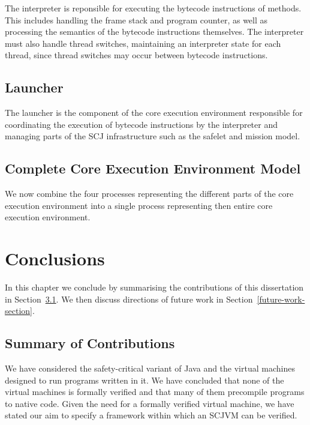 \documentclass[a4paper,10pt]{report}
\begin{document}
The interpreter is reponsible for executing the bytecode instructions
of methods.
This includes handling the frame stack and program counter, as well as
processing the semantics of the bytecode instructions themselves.
The interpreter must also handle thread switches, maintaining an
interpreter state for each thread, since thread switches may occur
between bytecode instructions.



\section{Launcher}
\label{cee-launcher-section}

The launcher is the component of the core execution environment
responsible for coordinating the execution of bytecode instructions by
the interpreter and managing parts of the SCJ infrastructure such as
the safelet and mission model.



\section{Complete Core Execution Environment Model}
\label{complete-cee-section}

We now combine the four \Circus{} processes representing the different
parts of the core execution environment into a single \Circus{}
process representing then entire core execution environment.



\chapter{Conclusions}
\label{conclusions-chapter}
In this chapter we conclude by summarising the contributions of this
dissertation in Section~\ref{summary-section}.
We then discuss directions of future work in
Section~\ref{future-work-section}.

\section{Summary of Contributions}
\label{summary-section}

We have considered the safety-critical variant of Java and the virtual
machines designed to run programs written in it.
We have concluded that none of the virtual machines is formally
verified and that many of them precompile programs to native code.
Given the need for a formally verified virtual machine, we have stated
our aim to specify a framework within which an SCJVM can
be verified.
\end{document}
